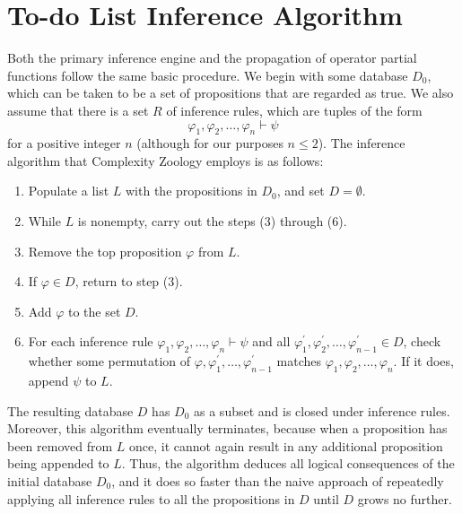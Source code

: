 \section{To-do List Inference Algorithm} \label{todo}

Both the primary inference engine and the propagation of operator partial
functions follow the same basic procedure. We begin with some database $D_0$,
which can be taken to be a set of propositions that are regarded as true. We
also assume that there is a set $R$ of inference rules, which are tuples of the
form
\[
\varphi_1,\varphi_2,\ldots,\varphi_n\vdash\psi
\]
for a positive integer $n$ (although for our purposes $n\leq 2$). The inference 
algorithm that Complexity Zoology employs is as follows:
\begin{enumerate}
\item Populate a list $L$ with the propositions in $D_0$, and set
  $D=\emptyset$.
\item While $L$ is nonempty, carry out the steps (3) through (6).
\item Remove the top proposition $\varphi$ from $L$.
\item If $\varphi\in D$, return to step (3).
\item Add $\varphi$ to the set $D$.
\item For each inference rule $\varphi_1,\varphi_2,\ldots,\varphi_n\vdash\psi$
  and all $\varphi_1^\prime,\varphi_2^\prime,\ldots,\varphi_{n-1}^\prime\in D$,
  check whether some permutation of
  $\varphi,\varphi_1^\prime,\ldots,\varphi_{n-1}^\prime$ matches
  $\varphi_1,\varphi_2,\ldots,\varphi_n$. If it does, append $\psi$ to $L$.
\end{enumerate}
The resulting database $D$ has $D_0$ as a subset and is closed under inference
rules. Moreover, this algorithm eventually terminates, because when a proposition
has been removed from $L$ once, it cannot again result in any additional
proposition being appended to $L$. Thus, the algorithm deduces all logical
consequences of the initial database $D_0$, and it does so faster than the naive
approach of repeatedly applying all inference rules to all the propositions in
$D$ until $D$ grows no further.
